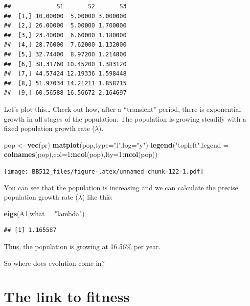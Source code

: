 \documentclass[
  a4paper]{book}
\newenvironment{Shaded}{\begin{snugshade}}{\end{snugshade}}
\newcommand{\AttributeTok}[1]{\textcolor[rgb]{0.13,0.29,0.53}{#1}}
\newcommand{\DecValTok}[1]{\textcolor[rgb]{0.00,0.00,0.81}{#1}}
\newcommand{\FunctionTok}[1]{\textcolor[rgb]{0.13,0.29,0.53}{\textbf{#1}}}
\newcommand{\NormalTok}[1]{#1}
\newcommand{\OtherTok}[1]{\textcolor[rgb]{0.56,0.35,0.01}{#1}}
\newcommand{\SpecialCharTok}[1]{\textcolor[rgb]{0.81,0.36,0.00}{\textbf{#1}}}
\newcommand{\StringTok}[1]{\textcolor[rgb]{0.31,0.60,0.02}{#1}}
\begin{document}
\begin{verbatim}
##             S1       S2       S3
##  [1,] 10.00000  5.00000 3.000000
##  [2,] 26.00000  5.00000 1.700000
##  [3,] 23.40000  6.60000 1.180000
##  [4,] 28.76000  7.62000 1.132000
##  [5,] 32.74400  8.97200 1.214800
##  [6,] 38.31760 10.45200 1.383120
##  [7,] 44.57424 12.19336 1.598448
##  [8,] 51.97034 14.21211 1.858715
##  [9,] 60.56588 16.56672 2.164697
\end{verbatim}

Let's plot this\ldots{} Check out how, after a ``transient'' period, there is exponential growth in all stages of the population. The population is growing steadily with a fixed population growth rate (\(\lambda\)).

\begin{Shaded}
\begin{Highlighting}[]
\NormalTok{pop }\OtherTok{\textless{}{-}} \FunctionTok{vec}\NormalTok{(pr)}
\FunctionTok{matplot}\NormalTok{(pop,}\AttributeTok{type=}\StringTok{"l"}\NormalTok{,}\AttributeTok{log=}\StringTok{"y"}\NormalTok{)}
\FunctionTok{legend}\NormalTok{(}\StringTok{"topleft"}\NormalTok{,}\AttributeTok{legend =} \FunctionTok{colnames}\NormalTok{(pop),}\AttributeTok{col=}\DecValTok{1}\SpecialCharTok{:}\FunctionTok{ncol}\NormalTok{(pop),}\AttributeTok{lty=}\DecValTok{1}\SpecialCharTok{:}\FunctionTok{ncol}\NormalTok{(pop))}
\end{Highlighting}
\end{Shaded}

\texttt{[image: BB512\_files/figure-latex/unnamed-chunk-122-1.pdf]}

You can see that the population is increasing and we can calculate the precise population growth rate (\(\lambda\)) like this:

\begin{Shaded}
\begin{Highlighting}[]
\FunctionTok{eigs}\NormalTok{(A1,}\AttributeTok{what =} \StringTok{"lambda"}\NormalTok{)}
\end{Highlighting}
\end{Shaded}

\begin{verbatim}
## [1] 1.165587
\end{verbatim}

Thus, the population is growing at 16.56\% per year.

So where does evolution come in?

\hypertarget{the-link-to-fitness}{%
\section{The link to fitness}\label{the-link-to-fitness}}
\end{document}
